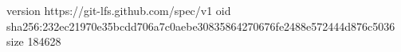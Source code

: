 version https://git-lfs.github.com/spec/v1
oid sha256:232ec21970e35bcdd706a7c0aebe30835864270676fe2488e572444d876c5036
size 184628
